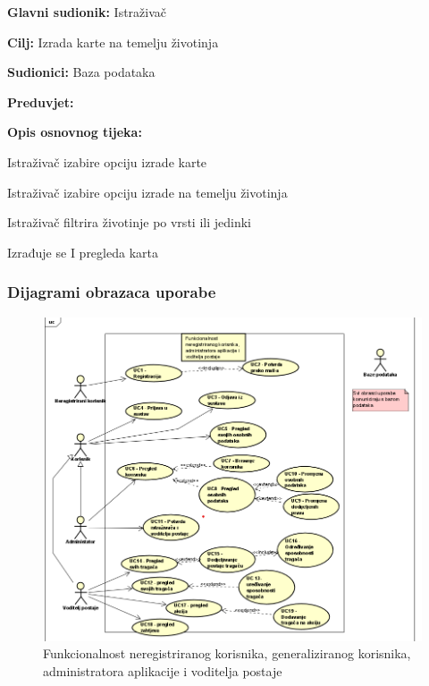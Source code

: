 					\begin{packed_item}
	
						\item \textbf{Glavni sudionik: } Istraživač
						\item  \textbf{Cilj:} Izrada karte na temelju životinja
						\item  \textbf{Sudionici:} Baza podataka
						\item  \textbf{Preduvjet:}
						\item  \textbf{Opis osnovnog tijeka:}
						
						\item[] \begin{packed_enum}
	
							\item 	Istraživač izabire opciju izrade karte
							\item  Istraživač izabire opciju izrade na temelju životinja
							\item  Istraživač filtrira životinje po vrsti ili jedinki
							\item  Izrađuje se I pregleda karta
							
							
						\end{packed_enum}
					\end{packed_item}
					
					
					
				\subsubsection{Dijagrami obrazaca uporabe}
					
					\textit{}
				
					\begin{figure}[H]
						\includegraphics[scale=0.9]{slike/dijagram admin.png} %
						\centering
						\caption{Funkcionalnost neregistriranog korisnika, generaliziranog korisnika, administratora aplikacije i voditelja postaje}
						\label{fig:Funkcionalnost neregistriranog korisnika, administratora aplikacije i voditelja postaje}
					\end{figure}
					
